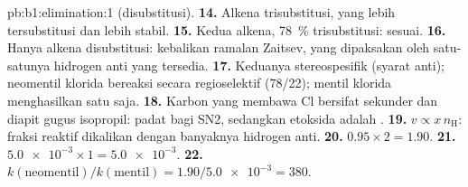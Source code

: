 \begin{solution}{pb:b1:elimination:1}
(disubstitusi).
\textbf{14.} Alkena trisubstitusi, yang lebih tersubstitusi dan lebih
stabil.
\textbf{15.} Kedua alkena, \qty{78}{\percent} trisubstitusi: sesuai.
\textbf{16.} Hanya alkena disubstitusi: kebalikan ramalan Zaitsev, yang
dipaksakan oleh satu-satunya hidrogen anti yang tersedia.
\textbf{17.} Keduanya stereospesifik (syarat anti); neomentil klorida
bereaksi secara regioselektif (78/22); mentil klorida menghasilkan satu
 saja.
\textbf{18.} Karbon yang membawa Cl bersifat sekunder dan diapit gugus
isopropil: padat bagi SN2, sedangkan etoksida adalah .
\textbf{19.} $v \propto x\,n_{\mathrm{H}}$: fraksi  reaktif dikalikan
dengan banyaknya hidrogen anti.
\textbf{20.} $0.95 \times 2 = 1.90$.
\textbf{21.} $\num{5.0e-3} \times 1 = \num{5.0e-3}$.
\textbf{22.} \textbf{$k(\text{neomentil})/k(\text{mentil}) = 1.90/\num{5.0e-3}
= 380$}.
\end{solution}
